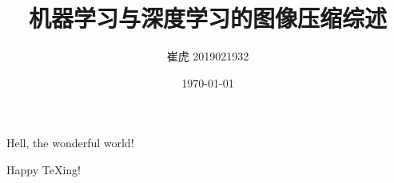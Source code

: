 \documentclass{ctexart}
\title{机器学习与深度学习的图像压缩综述}
\author{崔虎 2019021932}
\date{\today}
\begin{document}
	\maketitle
	Hell, the wonderful world!
	
	Happy \TeX ing!
	
	
	

\end{document}
